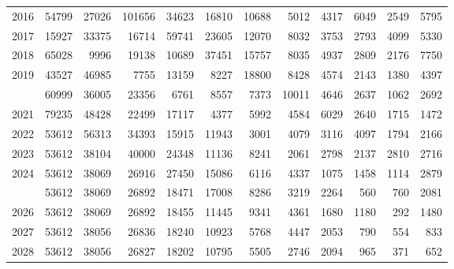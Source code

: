 \documentclass[
]{article}
\begin{document}
\begin{longtable}[t]{lrrrrrrrrrrr}
2016 & 54799 & 27026 & 101656 & 34623 & 16810 & 10688 & 5012 & 4317 & 6049 & 2549 & 5795\\
2017 & 15927 & 33375 & 16714 & 59741 & 23605 & 12070 & 8032 & 3753 & 2793 & 4099 & 5330\\
2018 & 65028 & 9996 & 19138 & 10689 & 37451 & 15757 & 8035 & 4937 & 2809 & 2176 & 7750\\
2019 & 43527 & 46985 & 7755 & 13159 & 8227 & 18800 & 8428 & 4574 & 2143 & 1380 & 4397\\
\addlinespace
2020 & 60999 & 36005 & 23356 & 6761 & 8557 & 7373 & 10011 & 4646 & 2637 & 1062 & 2692\\
2021 & 79235 & 48428 & 22499 & 17117 & 4377 & 5992 & 4584 & 6029 & 2640 & 1715 & 1472\\
2022 & 53612 & 56313 & 34393 & 15915 & 11943 & 3001 & 4079 & 3116 & 4097 & 1794 & 2166\\
2023 & 53612 & 38104 & 40000 & 24348 & 11136 & 8241 & 2061 & 2798 & 2137 & 2810 & 2716\\
2024 & 53612 & 38069 & 26916 & 27450 & 15086 & 6116 & 4337 & 1075 & 1458 & 1114 & 2879\\
\addlinespace
2025 & 53612 & 38069 & 26892 & 18471 & 17008 & 8286 & 3219 & 2264 & 560 & 760 & 2081\\
2026 & 53612 & 38069 & 26892 & 18455 & 11445 & 9341 & 4361 & 1680 & 1180 & 292 & 1480\\
2027 & 53612 & 38056 & 26836 & 18240 & 10923 & 5768 & 4447 & 2053 & 790 & 554 & 833\\
2028 & 53612 & 38056 & 26827 & 18202 & 10795 & 5505 & 2746 & 2094 & 965 & 371 & 652\\*
\end{longtable}
\end{document}
